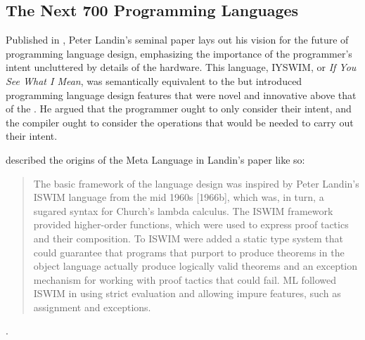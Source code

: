 \subsection{The Next 700 Programming Languages}

Published in \citeyear{landin_next_700_prog_langs_1966},
Peter Landin's seminal paper  lays out his vision for
the future of programming language design, emphasizing the importance of the programmer's intent
uncluttered by details of the hardware.
This language, IYSWIM, or \textit{If You See What I Mean}, was semantically
equivalent to the \lambdacalc but introduced programming language design features
that were novel and innovative above that of the \lambdacalc.
He argued that the programmer ought to only consider their intent, and the compiler ought to
consider the operations that would be needed to carry out their intent.

\citeauthor{hopl_history_of_ml_2020} described the origins of the Meta Language in Landin's paper
like so\cite{hopl_history_of_ml_2020}:

\begin{quotation}
	The basic framework of the language design was inspired by Peter Landin’s ISWIM language
	from the mid 1960s [1966b], which was, in turn, a sugared syntax for Church’s lambda calculus. The
	ISWIM framework provided higher-order functions, which were used to express proof tactics and
	their composition. To ISWIM were added a static type system that could guarantee that programs
	that purport to produce theorems in the object language actually produce logically valid theorems
	and an exception mechanism for working with proof tactics that could fail. ML followed ISWIM in
	using strict evaluation and allowing impure features, such as assignment and exceptions.
\end{quotation}

.
